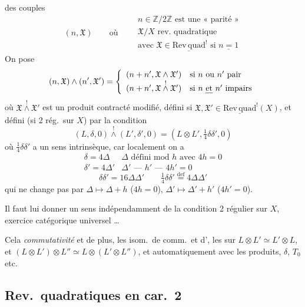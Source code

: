 \documentclass[11pt,a4paper]{article}
\begin{document}
des couples
\[
  (n, \mathfrak{X}) \qquad\text{où}\qquad
  \begin{array}{l}
    n \in \mathbb{Z}/2\mathbb{Z} \text{ est une « parité »}\\
    \mathfrak{X}/X \text{ rev.\ quadratique}\\
    \text{avec } \mathfrak{X} \in \underline{\mathrm{Rev\,quad}}^{!} \text{ si } \underline{n = 1}
  \end{array}
\]
On pose
\[
  (n, \mathfrak{X}) \wedge (n', \mathfrak{X}') =
  \left\{\begin{array}{ll}
    (n + n', \mathfrak{X} \wedge \mathfrak{X}') & \text{si $n$ ou $n'$ pair}\\
    (n + n', \mathfrak{X} \overset{!}{\wedge} \mathfrak{X}') & \text{si $n$ \emph{et} $n'$ impairs}
  \end{array}\right.
\]
où $\mathfrak{X} \overset{!}{\wedge} \mathfrak{X}'$ est un produit contracté modifié, défini si $\mathfrak{X}, \mathfrak{X}' \in \underline{\mathrm{Rev\,quad}}^{!}(X)$, et défini (si 2 rég.\ sur $X$) par la condition
\[
  (L, \delta, 0) \overset{!}{\wedge} (L', \delta', 0) = (L \otimes L', \tfrac{1}{4}\delta\delta', 0)
\]
où $\frac{1}{4}\delta\delta'$ a un sens intrinsèque, car localement on a
\[
  \begin{array}{ll}
    \delta = 4\Delta & \Delta \text{ défini mod } h \text{ avec } 4h = 0\\
    \delta' = 4\Delta' & \Delta' \text{ — } h' \text{ — } 4h' = 0
  \end{array}
\]
\[
  \delta\delta' = 16\Delta\Delta' \qquad \tfrac{1}{4}\delta\delta' \overset{\mathrm{def}}{=} 4\Delta\Delta'
\]
qui ne change pas par $\Delta \mapsto \Delta + h$ ($4h = 0$), $\Delta' \mapsto \Delta' + h'$ ($4h' = 0$).

Il faut lui donner un sens indépendamment de la condition 2 régulier sur $X$, exercice catégorique universel …

Cela  \emph{commutativité}  et de plus, les isom.\ de comm.\ et d', \ill{} les  sur $L \otimes L' \simeq L' \otimes L$, et $(L \otimes L') \otimes L'' \simeq L \otimes (L' \otimes L'')$, et  automatiquement avec les produits, $\delta$, $T_{0}$ etc.

\subsection{Rev.\ quadratiques en car.\ 2}
\end{document}
